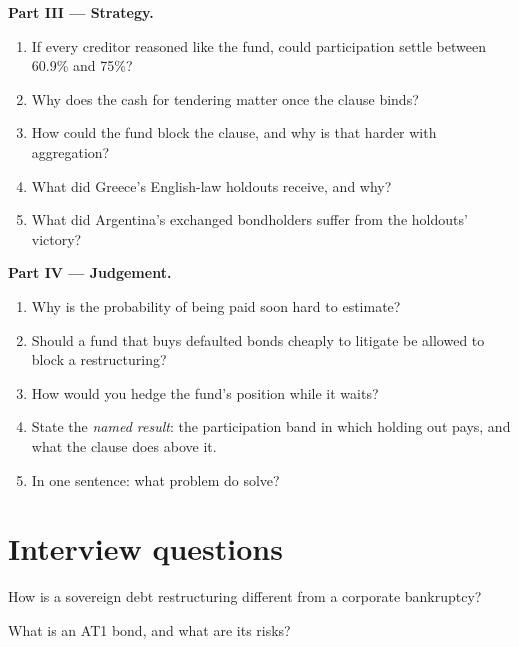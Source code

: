 \begin{problem}
\medskip\noindent\textbf{Part III --- Strategy.}
\begin{enumerate}[resume]
\item If every creditor reasoned like the fund, could participation settle between 60.9\%
and 75\%?
\item Why does the cash for tendering matter once the clause binds?
\item How could the fund block the clause, and why is that harder with aggregation?
\item What did Greece's English-law holdouts receive, and why?
\item What did Argentina's exchanged bondholders suffer from the holdouts' victory?
\end{enumerate}

\medskip\noindent\textbf{Part IV --- Judgement.}
\begin{enumerate}[resume]
\item Why is the probability of being paid soon hard to estimate?
\item Should a fund that buys defaulted bonds cheaply to litigate be allowed to block a
restructuring?
\item How would you hedge the fund's position while it waits?
\item State the \emph{named result}: the participation band in which holding out pays,
and what the clause does above it.
\item In one sentence: what problem do  solve?
\end{enumerate}
\end{problem}

\section{Interview questions}

\begin{interviewq}\label{iq:m2:distressed-sovereign-and-bank-capital-credit:1}
How is a sovereign debt restructuring different from a corporate bankruptcy?
\end{interviewq}

\begin{interviewq}\label{iq:m2:distressed-sovereign-and-bank-capital-credit:2}
What is an AT1 bond, and what are its risks?
\end{interviewq}

